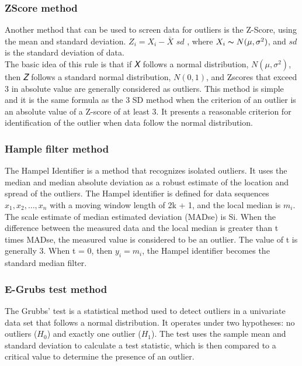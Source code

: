 \documentclass[preprint,12pt]{elsarticle}
\begin{document}
\subsubsection{ZScore method}
\label{sec3_2_3}
Another method that can be used to screen data for outliers is the Z-Score, using the mean and
standard deviation.
$Z_i = X_i  - \bar{X}$
$sd$ , where $X_i  \thicksim N(\mu, \sigma ^ 2)$, and $sd$ is the standard deviation of data.\\
The basic idea of this rule is that if 𝑋 follows a normal distribution, $N(\mu, \sigma ^ 2)$, then 𝑍 follows a standard normal distribution, $N(0, 1)$, and Zscores that exceed 3 in absolute value are generally considered as outliers. This method is simple and it is the same formula as the 3 SD method when the criterion of an outlier is an absolute value of a Z-score of at least 3. It presents a reasonable criterion for identification of the outlier when data follow the normal distribution.

\subsubsection{Hample filter method}
\label{sec3_2_4}
The Hampel Identifier is a method that recognizes isolated outliers. It uses the median and median absolute deviation as a robust estimate of the location and spread of the outliers. The Hampel identifier is defined for data sequences $x_1, x_2, …, x_n$ with a moving window length of 2k + 1, and the local median is $m_i$.\\
The scale estimate of median estimated deviation (MADse) is Si. When the difference between the measured data and the local median is greater than t times MADse, the measured value is considered to be an outlier. The value of t is generally 3. When t = 0, then $y_i = m_i$, the Hampel identifier becomes the standard median filter.

\subsubsection{E-Grubs test method}
\label{sec3_2_5}
The Grubbs’ test is a statistical method used to detect outliers in a univariate data set that follows a normal distribution. It operates under two hypotheses: no outliers ($H_0$) and exactly one outlier ($H_1$). The test uses the sample mean and standard deviation to calculate a test statistic, which is then compared to a critical value to determine the presence of an outlier.
\end{document}
